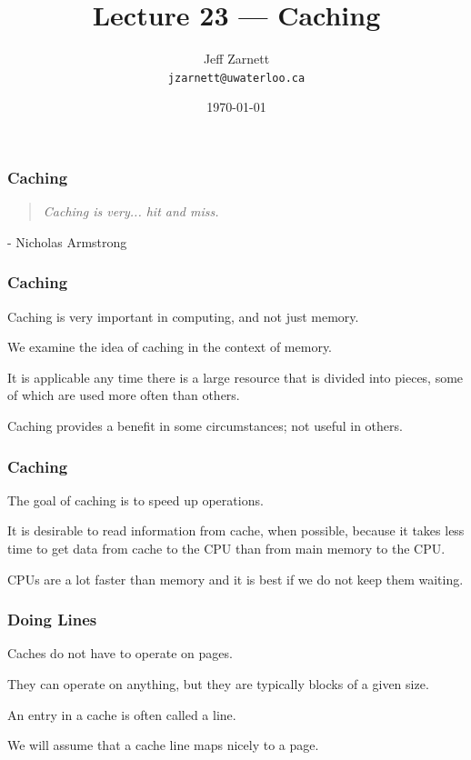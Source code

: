 

\title{Lecture 23 --- Caching }

\author{Jeff Zarnett \\ \small \texttt{jzarnett@uwaterloo.ca}}
\date{\today}




\begin{frame}
  \titlepage

 \end{frame}

\begin{frame}
\frametitle{Caching}

\vspace{5em}

\begin{quote}
\textit{Caching is very... hit and miss.}
\end{quote}
\hfill - Nicholas Armstrong

\end{frame}

\begin{frame}
\frametitle{Caching}

Caching is very important in computing, and not just memory. 

We examine the idea of caching in the context of memory.

It is applicable any time there is a large resource that is divided into pieces, some of which are used more often than others. 

Caching provides a benefit in some circumstances; not useful in others. 


\end{frame}

\begin{frame}
\frametitle{Caching}

The goal of caching is to speed up operations. 

It is desirable to read information from cache, when possible, because it takes less time to get data from cache to the CPU than from main memory to the CPU. 

CPUs are a lot faster than memory and it is best if we do not keep them waiting.

\end{frame}

\begin{frame}
\frametitle{Doing Lines}

Caches do not have to operate on pages. 

They can operate on anything, but they are typically blocks of a given size. 

An entry in a cache is often called a \alert{line}. 

We will assume that a cache line maps nicely to a page.

\end{frame}

